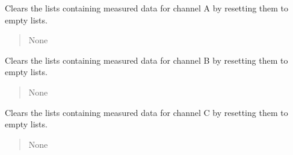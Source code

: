 \documentclass[letterpaper,10pt,english]{sphinxmanual}
\begin{document}
\begin{fulllineitems}
\begin{fulllineitems}
\end{fulllineitems}


\begin{fulllineitems}
\label{\detokenize{StartStopHist:StartStopHist.StartStopLogic.clear_a}}
\pysigstartsignatures
{}
\pysigstopsignatures
\sphinxAtStartPar
Clears the lists containing measured data for channel A by resetting them to empty lists.
\begin{quote}\begin{description}
\sphinxAtStartPar
None

\end{description}\end{quote}

\end{fulllineitems}


\begin{fulllineitems}
\label{\detokenize{StartStopHist:StartStopHist.StartStopLogic.clear_b}}
\pysigstartsignatures
{}
\pysigstopsignatures
\sphinxAtStartPar
Clears the lists containing measured data for channel B by resetting them to empty lists.
\begin{quote}\begin{description}
\sphinxAtStartPar
None

\end{description}\end{quote}

\end{fulllineitems}


\begin{fulllineitems}
\label{\detokenize{StartStopHist:StartStopHist.StartStopLogic.clear_c}}
\pysigstartsignatures
{}
\pysigstopsignatures
\sphinxAtStartPar
Clears the lists containing measured data for channel C by resetting them to empty lists.
\begin{quote}\begin{description}
\sphinxAtStartPar
None


\end{description}
\end{quote}
\end{fulllineitems}
\end{fulllineitems}
\end{document}
